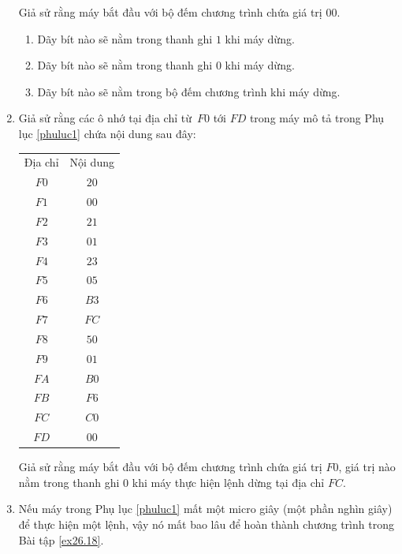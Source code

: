 \begin{multicols}{2}
\begin{enumerate}
\begin{tabular}{cc}
    \end{tabular}

    Giả sử rằng máy bắt đầu với bộ đếm chương trình chứa giá trị $00$.

    \begin{enumerate}
    \item Dãy bít nào sẽ nằm trong thanh ghi $1$ khi máy dừng.

    \item Dãy bít nào sẽ nằm trong thanh ghi $0$ khi máy dừng.

    \item Dãy bít nào sẽ nằm trong bộ đếm chương trình khi máy dừng.

    \end{enumerate}


  \item Giả sử rằng các ô nhớ tại địa chỉ từ~$F0$ tới $FD$ trong máy mô tả trong Phụ lục
    \ref{phuluc1} chứa nội dung sau đây:
    \label{ex26.18}

    \begin{tabular}{cc}
      Địa chỉ & Nội dung \\
      $F0$    & $20$     \\
      $F1$    & $00$     \\
      $F2$    & $21$     \\
      $F3$    & $01$     \\
      $F4$    & $23$     \\
      $F5$    & $05$     \\
      $F6$    & $B3$     \\
      $F7$    & $FC$     \\
      $F8$    & $50$     \\
      $F9$    & $01$     \\
      $FA$    & $B0$     \\
      $FB$    & $F6$     \\
      $FC$    & $C0$     \\
      $FD$    & $00$    

    \end{tabular}

    Giả sử rằng máy bắt đầu với bộ đếm chương trình chứa giá trị $F0$, giá trị nào nằm
    trong thanh ghi $0$ khi máy thực hiện lệnh dừng tại địa chỉ $FC$.

  \item Nếu máy trong Phụ lục \ref{phuluc1} mất một micro giây (một phần nghìn giây) để
    thực hiện một lệnh, vậy nó mất bao lâu để hoàn thành chương trình trong Bài tập
    \ref{ex26.18}.


\end{enumerate}
\end{multicols}
